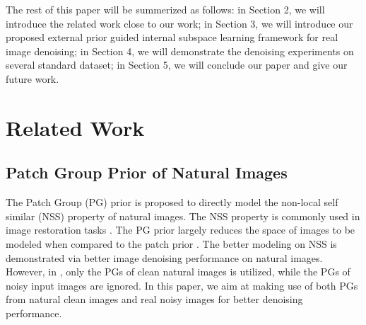 \documentclass[10pt,twocolumn,letterpaper]{article}
\begin{document}
The rest of this paper will be summerized as follows: in Section 2, we will introduce the related work close to our work; in Section 3, we will introduce our proposed external prior guided internal subspace learning framework for real image denoising; in Section 4, we will demonstrate the denoising experiments on several standard dataset; in Section 5, we will conclude our paper and give our future work.

\section{Related Work}
\subsection{Patch Group Prior of Natural Images}
The Patch Group (PG) prior \cite{pgpd} is proposed to directly model the non-local self similar (NSS) property of natural images. The NSS property is commonly used in image restoration tasks \cite{nlm,bm3d,lssc,wnnm,pgpd}. The PG prior largely reduces the space of images to be modeled when compared to the patch prior \cite{epll}. The better modeling on NSS is demonstrated via better image denoising performance on natural images. However, in \cite{pgpd}, only the PGs of clean natural images is utilized, while the PGs of noisy input images are ignored. In this paper, we aim at making use of both PGs from natural clean images and real noisy images for better denoising performance. 

\end{document}
